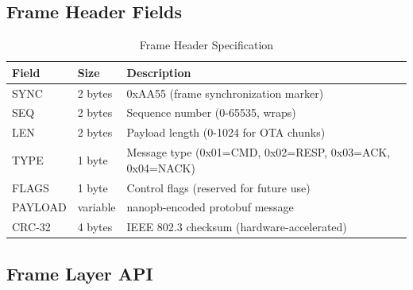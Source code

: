 \documentclass[12pt,letterpaper]{article}
\begin{document}
\subsection{Frame Header Fields}

\begin{table}[h]
\centering
\caption{Frame Header Specification}
\begin{tabular}{llp{6cm}}
\toprule
\textbf{Field} & \textbf{Size} & \textbf{Description} \\
\midrule
SYNC & 2 bytes & 0xAA55 (frame synchronization marker) \\
SEQ & 2 bytes & Sequence number (0-65535, wraps) \\
LEN & 2 bytes & Payload length (0-1024 for OTA chunks) \\
TYPE & 1 byte & Message type (0x01=CMD, 0x02=RESP, 0x03=ACK, 0x04=NACK) \\
FLAGS & 1 byte & Control flags (reserved for future use) \\
PAYLOAD & variable & nanopb-encoded protobuf message \\
CRC-32 & 4 bytes & IEEE 802.3 checksum (hardware-accelerated) \\
\bottomrule
\end{tabular}
\end{table}

\subsection{Frame Layer API}
\end{document}
